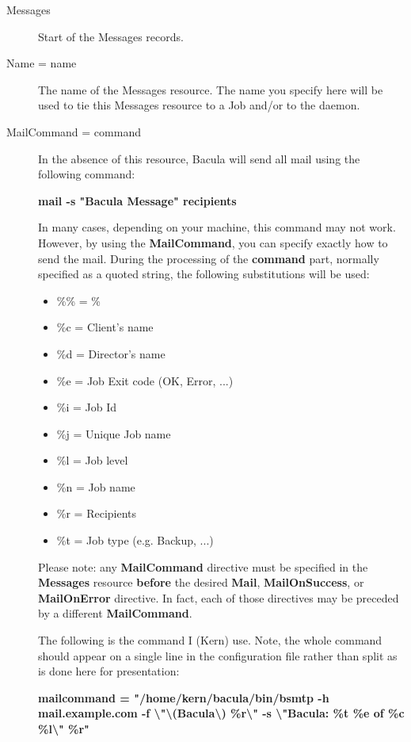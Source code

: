 \begin{description}

\item [Messages]
   Start of the Messages records.  

\item [Name = \lt{}name\gt{}]
   The name of the Messages resource.  The name you specify here will be used to
   tie this Messages  resource to a Job and/or to the daemon.  

\label{mailcommand}
\item [MailCommand = \lt{}command\gt{}]
   In the absence of this resource,  Bacula will send all mail using the
   following command:  

{\bf mail -s "Bacula Message" \lt{}recipients\gt{}}  

In many cases, depending on your machine, this command may not work.  
However, by using the {\bf MailCommand}, you can specify exactly how to
send the mail.  During the processing of the {\bf command} part, normally
specified as a quoted string, the following substitutions will be used:

\begin{itemize}
\item \%\% = \%  
\item \%c = Client's name  
\item \%d = Director's name  
\item \%e = Job Exit code (OK, Error, ...)  
\item \%i = Job Id  
\item \%j = Unique Job name  
\item \%l = Job level  
\item \%n = Job name  
\item \%r = Recipients  
\item \%t = Job type (e.g. Backup, ...)  
\end{itemize}

Please note: any {\bf MailCommand} directive must be specified 
in the {\bf Messages} resource {\bf before} the desired
{\bf Mail}, {\bf MailOnSuccess}, or {\bf MailOnError}
directive. In fact, each of those directives may be preceded by
a different {\bf MailCommand}.

The following is the command I (Kern) use. Note, the whole  command should
appear on a single line in the configuration file  rather than split as is
done here for presentation:  

{\bf mailcommand = "/home/kern/bacula/bin/bsmtp -h mail.example.com -f
\textbackslash{}"\textbackslash{}(Bacula\textbackslash{})
\%r\textbackslash{}" -s \textbackslash{}"Bacula: \%t \%e of \%c
\%l\textbackslash{}" \%r"}


\end{description}

